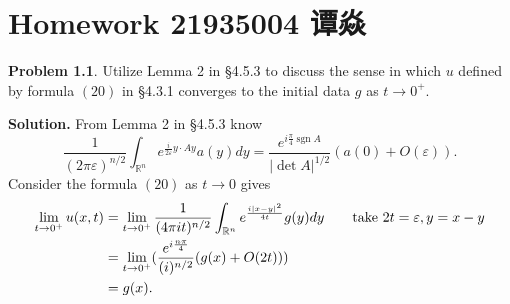 \documentclass[a4paper]{book}
\makeatletter
\newenvironment{solution}%
{\noindent\textbf{Solution.}}%
{\qedhere}
\newcommand{\voidenvironment}[1]{%
  \expandafter\providecommand\csname env@#1@save@env\endcsname{}%
  \expandafter\providecommand\csname env@#1@process\endcsname{}%
  \@ifundefined{#1}{}{\RenewEnviron{#1}{}}%
}
\numberwithin{equation}{chapter}
\theoremstyle{definition}
\newtheorem{pro}[exm]{Problem}
\makeatother
\begin{document}
\pagestyle{empty}
% 



\setcounter{chapter}{11}




\chapter{Homework 21935004 谭焱}


\begin{pro}
  Utilize Lemma 2 in \S4.5.3 to discuss the sense in which $u$ defined by formula $(20)$ in \S4.3.1 converges to the initial data $g$ as $t \rightarrow 0^+$.
\end{pro}

\begin{solution}
  From Lemma 2 in \S4.5.3 know
  \[\frac{1}{(2\pi \varepsilon)^{n/2}} \int_{\mathbb{R}^n} e^{\frac{i}{2 \varepsilon} y \cdot Ay} a(y) dy = \frac{e^{i\frac{\pi}{4} \operatorname{sgn} A}}{\left| \det A \right|^{1/2}} (a(0) + O(\varepsilon)).\]
  Consider the formula $(20)$ as $t \rightarrow 0$ gives
  \begin{align*}
    \lim_{t \rightarrow 0^+} u(x,t) &= \lim_{t \rightarrow 0^+} \frac{1}{(4 \pi i t)^{n/2}} \int_{\mathbb{R}^n} e^{\frac{i \left| x - y \right|^2}{4t}} g(y) dy \qquad \textmd{take } 2t = \varepsilon, y = x-y \\
                                    &= \lim_{t \rightarrow 0^+} (\frac{e^{i\frac{n\pi}{4}}}{(i)^{n/2}}(g(x) + O(2t))) \\
    &= g(x).
  \end{align*}
\end{solution}
\end{document}
